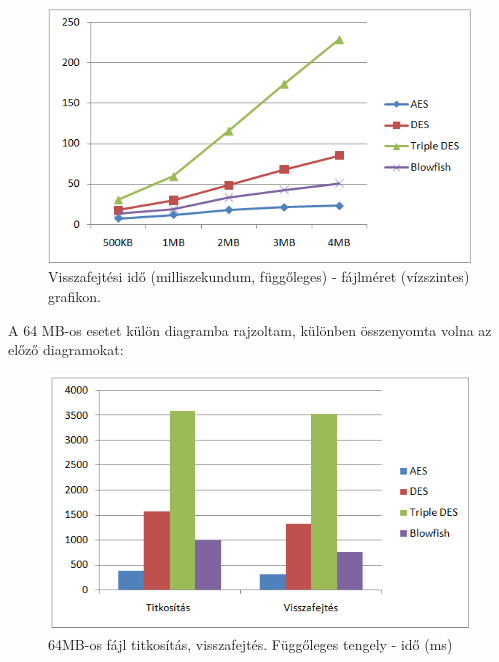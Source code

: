\begin{figure}[h]
	\centering
	\includegraphics[scale=0.8]{images/alg_graf_2.png}
	\caption{Visszafejtési idő (milliszekundum, függőleges) - fájlméret (vízszintes) grafikon.}
	\label{fig:alg_visszafejtes_graf}
\end{figure}


\newpage \noindent  A 64 MB-os esetet külön diagramba rajzoltam, különben összenyomta volna az előző diagramokat:
\begin{figure}[h]
	\centering
	\includegraphics[scale=0.8]{images/alg_graf_3.png}
	\caption{64MB-os fájl titkosítás, visszafejtés. Függőleges tengely - idő (ms)}
	\label{fig:alg_64mb_graf}
\end{figure}

